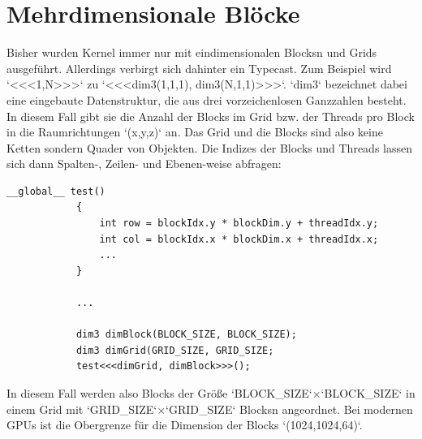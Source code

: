		\section{Mehrdimensionale Bl\"ocke}
		Bisher wurden \Gls{Kernel} immer nur mit eindimensionalen \Glspl{Block}n und \Glspl{Grid} ausgeführt. Allerdings verbirgt sich dahinter ein Typecast. Zum Beispiel wird \li`<<<1,N>>>` zu \li`<<<dim3(1,1,1), dim3(N,1,1)>>>`. \li`dim3` bezeichnet dabei eine eingebaute Datenstruktur, die aus drei vorzeichenlosen Ganzzahlen besteht. In diesem Fall gibt sie die Anzahl der \Glspl{Block} im \Gls{Grid} bzw. der \Glspl{Thread} pro \Gls{Block} in die Raumrichtungen \li`(x,y,z)` an. Das \Gls{Grid} und die \Glspl{Block} sind also keine Ketten sondern Quader von Objekten. Die Indizes der \Glspl{Block} und \Glspl{Thread} lassen sich dann Spalten-, Zeilen- und Ebenen-weise abfragen: 			
		\begin{lstlisting}[caption=Multidimensionale Blöcke]
			__global__ test()
			{
				int row = blockIdx.y * blockDim.y + threadIdx.y;
				int col = blockIdx.x * blockDim.x + threadIdx.x;
				...
			}
    		
    		...

		    dim3 dimBlock(BLOCK_SIZE, BLOCK_SIZE);
    		dim3 dimGrid(GRID_SIZE, GRID_SIZE;
    		test<<<dimGrid, dimBlock>>>();
		\end{lstlisting}
        In diesem Fall werden also \Glspl{Block} der Größe \li`BLOCK_SIZE`$\times$\li`BLOCK_SIZE` in einem \Gls{Grid} mit \li`GRID_SIZE`$\times$\li`GRID_SIZE` \Glspl{Block}n angeordnet. Bei modernen GPUs ist die Obergrenze für die Dimension der \Glspl{Block} \li`(1024,1024,64)`.
        
